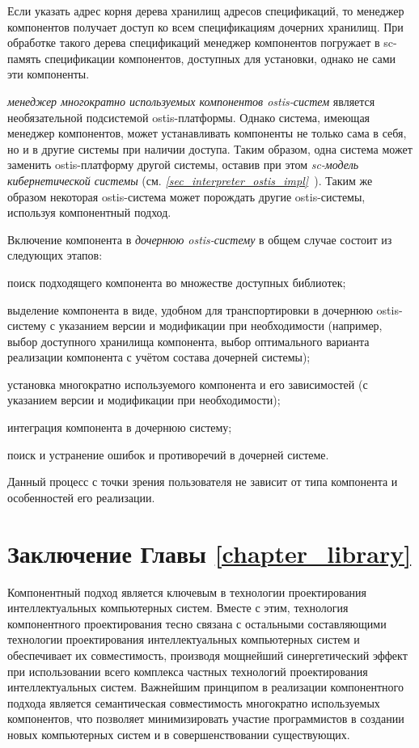 Если указать адрес корня дерева хранилищ адресов спецификаций, то менеджер компонентов получает доступ ко всем спецификациям дочерних хранилищ. При обработке такого дерева спецификаций менеджер компонентов погружает в sc-память спецификации компонентов, доступных для установки, однако не сами эти компоненты.

\textit{менеджер многократно используемых компонентов ostis-систем} является необязательной подсистемой ostis-платформы. Однако система, имеющая менеджер компонентов, может устанавливать компоненты не только сама в себя, но и в другие системы при наличии доступа. Таким образом, одна система может заменить ostis-платформу другой системы, оставив при этом \textit{sc-модель кибернетической системы} (см. \textit{\ref{sec_interpreter_ostis_impl}~}). Таким же образом некоторая ostis-система может порождать другие ostis-системы, используя компонентный подход.

Включение компонента в \textit{дочернюю ostis-систему} в общем случае состоит из следующих этапов:
\begin{textitemize}
	\item поиск подходящего компонента во множестве доступных библиотек;
	\item выделение компонента в виде, удобном для транспортировки в дочернюю ostis-систему с указанием версии и модификации при необходимости (например, выбор доступного хранилища компонента, выбор оптимального варианта реализации компонента с учётом состава дочерней системы);
	\item установка многократно используемого компонента и его зависимостей (с указанием версии и модификации при необходимости);
	\item интеграция компонента в дочернюю систему;
	\item поиск и устранение ошибок и противоречий в дочерней системе.
\end{textitemize}

Данный процесс с точки зрения пользователя не зависит от типа компонента и особенностей его реализации.

\section*{Заключение Главы \ref{chapter_library}}
\label{ostis_library_conclusion}

Компонентный подход является ключевым в технологии проектирования интеллектуальных компьютерных систем. Вместе с этим, технология компонентного проектирования тесно связана с остальными составляющими технологии проектирования интеллектуальных компьютерных систем и обеспечивает их совместимость, производя мощнейший синергетический эффект при использовании всего комплекса частных технологий проектирования интеллектуальных систем. Важнейшим принципом в реализации компонентного подхода является семантическая совместимость многократно используемых компонентов, что позволяет минимизировать участие программистов в создании новых компьютерных систем и в совершенствовании существующих.

